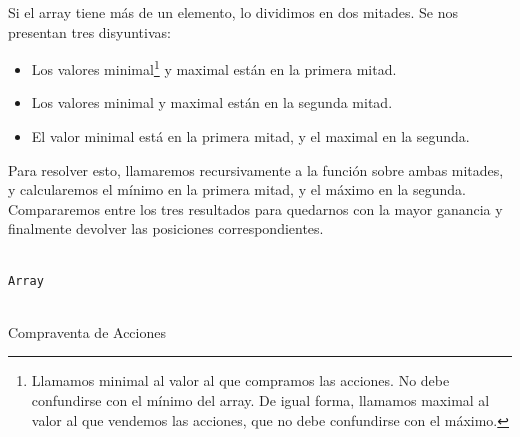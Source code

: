 \documentclass[a4paper, 11pt]{article} %
\begin{document}
	Si el array tiene más de un elemento, lo dividimos en dos mitades. Se nos presentan tres disyuntivas:
	\begin{itemize}
		\item Los valores minimal\footnote[1]{Llamamos minimal al valor al que compramos las acciones. No debe confundirse con el mínimo del array. De igual forma, llamamos maximal al valor al que vendemos las acciones, que no debe confundirse con el máximo.}
			 y maximal están en la primera mitad.
		\item Los valores minimal y maximal están en la segunda mitad. 
		\item El valor minimal está en la primera mitad, y el maximal en la segunda. 
	\end{itemize}
	
	Para resolver esto, llamaremos recursivamente a la función sobre ambas mitades, y calcularemos el mínimo en la primera mitad, y el máximo en la segunda. Compararemos entre los tres resultados para quedarnos con la mayor ganancia y finalmente devolver las posiciones correspondientes. 
	
	\begin{algorithm}[H]
		\begin{algorithmic}[1]
			\REQUIRE \ \\
	        	\texttt{Array}\\\
	     	\ELSE
	     		\RETURN{Momentos de compra y venta}
	    	\ENDIF
		\end{algorithmic}
		\caption{Compraventa de Acciones}
		\label{algoritmo}
	\end{algorithm}
\end{document}
